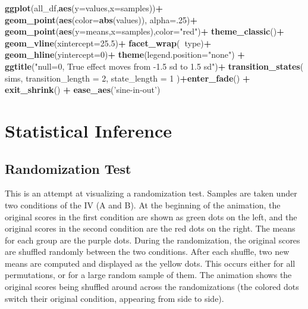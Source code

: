 \documentclass[
]{book}
\newenvironment{Shaded}{\begin{snugshade}}{\end{snugshade}}
\newcommand{\DataTypeTok}[1]{\textcolor[rgb]{0.13,0.29,0.53}{#1}}
\newcommand{\DecValTok}[1]{\textcolor[rgb]{0.00,0.00,0.81}{#1}}
\newcommand{\FloatTok}[1]{\textcolor[rgb]{0.00,0.00,0.81}{#1}}
\newcommand{\KeywordTok}[1]{\textcolor[rgb]{0.13,0.29,0.53}{\textbf{#1}}}
\newcommand{\NormalTok}[1]{#1}
\newcommand{\OperatorTok}[1]{\textcolor[rgb]{0.81,0.36,0.00}{\textbf{#1}}}
\newcommand{\StringTok}[1]{\textcolor[rgb]{0.31,0.60,0.02}{#1}}
\begin{document}
\begin{Shaded}
\begin{Highlighting}[]
\KeywordTok{ggplot}\NormalTok{(all_df,}\KeywordTok{aes}\NormalTok{(}\DataTypeTok{y=}\NormalTok{values,}\DataTypeTok{x=}\NormalTok{samples))}\OperatorTok{+}
\StringTok{  }\KeywordTok{geom_point}\NormalTok{(}\KeywordTok{aes}\NormalTok{(}\DataTypeTok{color=}\KeywordTok{abs}\NormalTok{(values)), }\DataTypeTok{alpha=}\NormalTok{.}\DecValTok{25}\NormalTok{)}\OperatorTok{+}
\StringTok{  }\KeywordTok{geom_point}\NormalTok{(}\KeywordTok{aes}\NormalTok{(}\DataTypeTok{y=}\NormalTok{means,}\DataTypeTok{x=}\NormalTok{samples),}\DataTypeTok{color=}\StringTok{"red"}\NormalTok{)}\OperatorTok{+}
\StringTok{  }\KeywordTok{theme_classic}\NormalTok{()}\OperatorTok{+}
\StringTok{  }\KeywordTok{geom_vline}\NormalTok{(}\DataTypeTok{xintercept=}\FloatTok{25.5}\NormalTok{)}\OperatorTok{+}
\StringTok{  }\KeywordTok{facet_wrap}\NormalTok{(}\OperatorTok{~}\NormalTok{type)}\OperatorTok{+}
\StringTok{  }\KeywordTok{geom_hline}\NormalTok{(}\DataTypeTok{yintercept=}\DecValTok{0}\NormalTok{)}\OperatorTok{+}
\StringTok{  }\KeywordTok{theme}\NormalTok{(}\DataTypeTok{legend.position=}\StringTok{"none"}\NormalTok{) }\OperatorTok{+}
\StringTok{  }\KeywordTok{ggtitle}\NormalTok{(}\StringTok{"null=0, True effect moves from -1.5 sd to 1.5 sd"}\NormalTok{)}\OperatorTok{+}
\StringTok{  }\KeywordTok{transition_states}\NormalTok{(}
\NormalTok{    sims,}
    \DataTypeTok{transition_length =} \DecValTok{2}\NormalTok{,}
    \DataTypeTok{state_length =} \DecValTok{1}
\NormalTok{  )}\OperatorTok{+}\KeywordTok{enter_fade}\NormalTok{() }\OperatorTok{+}\StringTok{ }
\StringTok{  }\KeywordTok{exit_shrink}\NormalTok{() }\OperatorTok{+}
\StringTok{  }\KeywordTok{ease_aes}\NormalTok{(}\StringTok{'sine-in-out'}\NormalTok{)}
\end{Highlighting}
\end{Shaded}

\hypertarget{statistical-inference}{%
\section{Statistical Inference}\label{statistical-inference}}

\hypertarget{randomization-test}{%
\subsection{Randomization Test}\label{randomization-test}}

This is an attempt at visualizing a randomization test. Samples are taken under two conditions of the IV (A and B). At the beginning of the animation, the original scores in the first condition are shown as green dots on the left, and the original scores in the second condition are the red dots on the right. The means for each group are the purple dots. During the randomization, the original scores are shuffled randomly between the two conditions. After each shuffle, two new means are computed and displayed as the yellow dots. This occurs either for all permutations, or for a large random sample of them. The animation shows the original scores being shuffled around across the randomizations (the colored dots switch their original condition, appearing from side to side).
\end{document}
